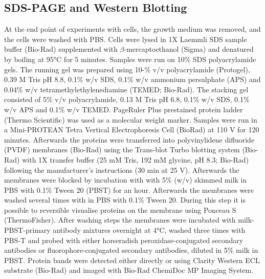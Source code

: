 \subsection{SDS-PAGE and Western Blotting} \label{subsec:SDS-PAGE and Western Blotting}
At the end point of experiments with cells, the growth medium was removed, and the cells were washed with PBS. Cells were lysed in 1X Laemmli SDS sample buffer (Bio-Rad) supplemented with \(\beta\)-mercaptoethanol (Sigma) and denatured by boiling at 95°C for 5 minutes. Samples were run on 10\% SDS polyacrylamide gels. The running gel was prepared using 10-\% v/v polyacrylamide (Protogel), 0.39 M Tris pH 8.8, 0.1\% w/v SDS, 0.1\% w/v ammonium persulphate (APS) and 0.04\% w/v tetramethylethylenediamine (TEMED; Bio-Rad). The stacking gel consisted of 5\% v/v polyacrylamide, 0.13 M Tris pH 6.8, 0.1\% w/v SDS, 0.1\% w/v APS and 0.1\% w/v TEMED. PageRuler Plus prestained protein ladder (Thermo Scientific) was used as a molecular weight marker. Samples were run in a Mini-PROTEAN Tetra Vertical Electrophoresis Cell (BioRad) at 110 V for 120 minutes. Afterwards the proteins were transferred into polyvinylidene difluoride (PVDF) membranes (Bio-Rad) using the Trans-blot Turbo blotting system (Bio-Rad) with 1X transfer buffer (25 mM Tris, 192 mM glycine, pH 8.3; Bio-Rad) following the manufacturer’s instructions (30 min at 25 V). Afterwards the membranes were blocked by incubation with with 5\% (w/v) skimmed milk in PBS with 0.1\% Tween 20 (PBST) for an hour. Afterwards the membranes were washed several times with in PBS with 0.1\% Tween 20. During this step it is possible to reversible visualise proteins on the membrane using Ponceau S (ThermoFisher). After washing steps the membranes were incubated with milk-PBST-primary antibody mixtures overnight at 4°C, washed three times with PBS-T and probed with either horseradish peroxidase-conjugated secondary antibodies or fluorophore-conjugated secondary antibodies, diluted in 5\% milk in PBST. Protein bands were detected either directly or using Clarity Western ECL substrate (Bio-Rad) and imaged with Bio-Rad ChemiDoc MP Imaging System.




